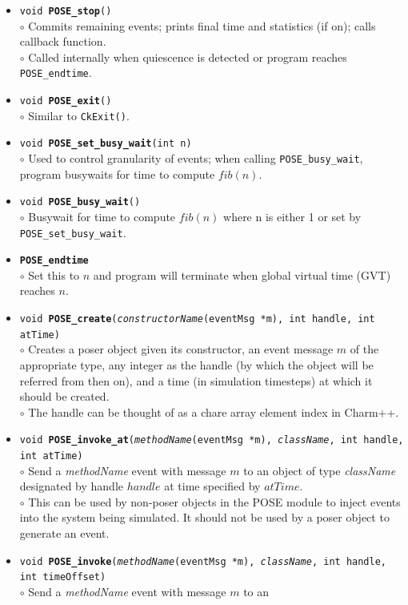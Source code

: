 \documentclass[10pt]{article}
\begin{document}
\begin{itemize}
\item {\tt void {\bf POSE\_stop}()}\\
	$\circ$ Commits remaining events; prints final time and
	statistics (if on); calls callback function.\\
	$\circ$ Called internally when quiescence is detected or
	program reaches {\tt POSE\_endtime}.
\item {\tt void {\bf POSE\_exit}()}\\
	$\circ$ Similar to {\tt CkExit()}.
\item {\tt void {\bf POSE\_set\_busy\_wait}(int n)}\\
	$\circ$ Used to control granularity of events; when calling
	{\tt POSE\_busy\_wait}, program busywaits for time to compute $fib(n)$.
\item {\tt void {\bf POSE\_busy\_wait}()}\\
	$\circ$ Busywait for time to compute $fib(n)$ where n is either
	1 or set by {\tt POSE\_set\_busy\_wait}.
\item {\tt {\bf POSE\_endtime}}\\
	$\circ$ Set this to $n$ and program will terminate when global
	virtual time (GVT) reaches $n$.
\item {\tt void {\bf POSE\_create}({\it constructorName}(eventMsg *m), int
handle, int atTime)}\\
	$\circ$ Creates a poser object given its constructor, an event
	message $m$ of the appropriate type, any integer as the handle
	(by which the object will be referred from then on), and a
	time (in simulation timesteps) at which it should be created.\\ 
	$\circ$ The handle can be thought of as a chare array element
	index in Charm++.
\item {\tt void {\bf POSE\_invoke\_at}({\it methodName}(eventMsg *m),
{\it className}, int handle, int atTime)}\\
	$\circ$ Send a {\it methodName} event with message $m$ to an
	object of type {\it className} designated by handle $handle$
	at time specified by $atTime$.\\
	$\circ$ This can be used by non-poser objects in the POSE
	module to inject events into the system being simulated.  It
	should not be used by a poser object to generate an event.
\item {\tt void {\bf POSE\_invoke}({\it methodName}(eventMsg *m),
{\it className}, int handle, int timeOffset)}\\
	$\circ$ Send a {\it methodName} event with message $m$ to an

\end{itemize}
\end{document}
